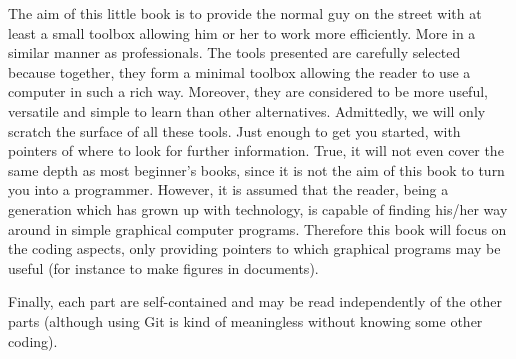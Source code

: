 The aim of this little book is to provide the normal guy on the street with at least a small toolbox allowing him or her to work more efficiently. More in a similar manner as professionals. The tools presented are carefully selected because together, they form a minimal toolbox allowing the reader to use a computer in such a rich way. Moreover, they are considered to be more useful, versatile and simple to learn than other alternatives. Admittedly, we will only scratch the surface of all these tools. Just enough to get you started, with pointers of where to look for further information. True, it will not even cover the same depth as most beginner’s books, since it is not the aim of this book to turn you into a programmer. However, it is assumed that the reader, being a generation which has grown up with technology, is capable of finding his/her way around in simple graphical computer programs. Therefore this book will focus on the coding aspects, only providing pointers to which graphical programs may be useful (for instance to make figures in documents).

Finally, each part are self-contained and may be read independently of the other parts (although using Git is kind of meaningless without knowing some other coding).